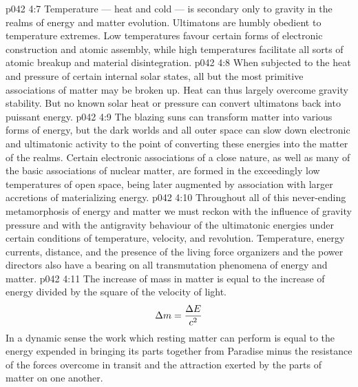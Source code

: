 \vs p042 4:7 Temperature --- heat and cold --- is secondary only to gravity in the realms of energy and matter evolution. Ultimatons are humbly obedient to temperature extremes. Low temperatures favour certain forms of electronic construction and atomic assembly, while high temperatures facilitate all sorts of atomic breakup and material disintegration.
\vs p042 4:8 When subjected to the heat and pressure of certain internal solar states, all but the most primitive associations of matter may be broken up. Heat can thus largely overcome gravity stability. But no known solar heat or pressure can convert ultimatons back into puissant energy.
\vs p042 4:9 The blazing suns can transform matter into various forms of energy, but the dark worlds and all outer space can slow down electronic and ultimatonic activity to the point of converting these energies into the matter of the realms. Certain electronic associations of a close nature, as well as many of the basic associations of nuclear matter, are formed in the exceedingly low temperatures of open space, being later augmented by association with larger accretions of materializing energy.
\vs p042 4:10 Throughout all of this never\hyp{}ending metamorphosis of energy and matter we must reckon with the influence of gravity pressure and with the antigravity behaviour of the ultimatonic energies under certain conditions of temperature, velocity, and revolution. Temperature, energy currents, distance, and the presence of the living force organizers and the power directors also have a bearing on all transmutation phenomena of energy and matter.
\vs p042 4:11 The increase of mass in matter is equal to the increase of energy divided by the square of the velocity of light. \begin{equation}\Delta m = {\Delta E \over c^2}\end{equation} In a dynamic sense the work which resting matter can perform is equal to the energy expended in bringing its parts together from Paradise minus the resistance of the forces overcome in transit and the attraction exerted by the parts of matter on one another.
